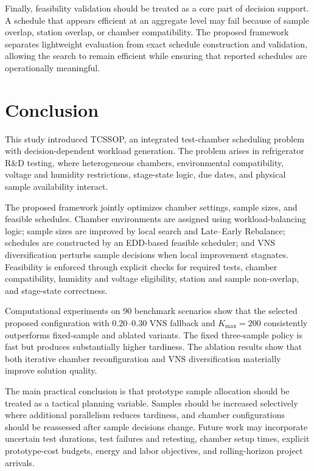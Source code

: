 \documentclass[11pt]{article}
\begin{document}
Finally, feasibility validation should be treated as a core part of decision support. A schedule that appears efficient at an aggregate level may fail because of sample overlap, station overlap, or chamber compatibility. The proposed framework separates lightweight evaluation from exact schedule construction and validation, allowing the search to remain efficient while ensuring that reported schedules are operationally meaningful.

\section{Conclusion}
\label{sec:conc}

This study introduced TCSSOP, an integrated test-chamber scheduling problem with decision-dependent workload generation. The problem arises in refrigerator R\&D testing, where heterogeneous chambers, environmental compatibility, voltage and humidity restrictions, stage-state logic, due dates, and physical sample availability interact.

The proposed framework jointly optimizes chamber settings, sample sizes, and feasible schedules. Chamber environments are assigned using workload-balancing logic; sample sizes are improved by local search and Late--Early Rebalance; schedules are constructed by an EDD-based feasible scheduler; and VNS diversification perturbs sample decisions when local improvement stagnates. Feasibility is enforced through explicit checks for required tests, chamber compatibility, humidity and voltage eligibility, station and sample non-overlap, and stage-state correctness.

Computational experiments on 90 benchmark scenarios show that the selected proposed configuration with \(0.20\)--\(0.30\) VNS fallback and \(K_{\max}=200\) consistently outperforms fixed-sample and ablated variants. The fixed three-sample policy is fast but produces substantially higher tardiness. The ablation results show that both iterative chamber reconfiguration and VNS diversification materially improve solution quality.

The main practical conclusion is that prototype sample allocation should be treated as a tactical planning variable. Samples should be increased selectively where additional parallelism reduces tardiness, and chamber configurations should be reassessed after sample decisions change. Future work may incorporate uncertain test durations, test failures and retesting, chamber setup times, explicit prototype-cost budgets, energy and labor objectives, and rolling-horizon project arrivals.
\end{document}
